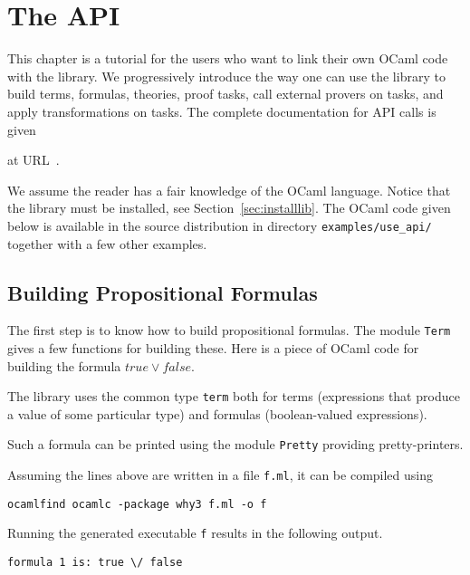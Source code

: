 \chapter{The \why API}
\label{chap:api}

This chapter is a tutorial for the users who want to link their own
OCaml code with the \why library. We progressively introduce the way
one can use the library to build terms, formulas, theories, proof
tasks, call external provers on tasks, and apply transformations on
tasks. The complete documentation for API calls is given\begin{latexonly}
at URL~\urlapi{}.\end{latexonly}

We assume the reader has a fair knowledge of the OCaml
language. Notice that the \why library must be installed, see
Section~\ref{sec:installlib}. The OCaml code given below is available in
the source distribution in directory \verb|examples/use_api/| together
with a few other examples.


\section{Building Propositional Formulas}

The first step is to know how to build propositional formulas. The
module \texttt{Term} gives a few functions for building these. Here is
a piece of OCaml code for building the formula $\mathit{true} \lor
\mathit{false}$.

The library uses the common type \texttt{term} both for terms
(\ie expressions that produce a value of some particular type)
and formulas (\ie boolean-valued expressions).

Such a formula can be printed using the module \texttt{Pretty}
providing pretty-printers.


Assuming the lines above are written in a file \texttt{f.ml}, it can
be compiled using
\begin{verbatim}
ocamlfind ocamlc -package why3 f.ml -o f
\end{verbatim}
Running the generated executable \texttt{f} results in the following output.
\begin{verbatim}
formula 1 is: true \/ false
\end{verbatim}

